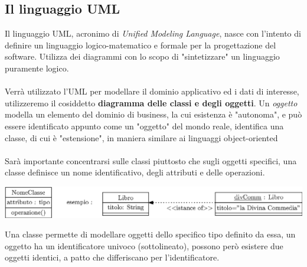\documentclass[12pt, letterpaper]{article}
\newcommand{\acc}{\\\hphantom{}\\}
\begin{document}
 \subsection{Il linguaggio UML}
Il linguaggio UML, acronimo di \textit{Unified Modeling Language}, nasce con l'intento di definire un 
linguaggio logico-matematico e formale per la progettazione del software. Utilizza dei diagrammi con lo scopo di 
"sintetizzare" un linguaggio puramente logico. \acc 
Verrà utilizzato l'UML per modellare il dominio applicativo ed i dati di interesse, utilizzeremo il cosiddetto 
\textbf{diagramma delle classi e degli oggetti}. Un \textit{oggetto} modella un elemento del dominio di business, 
la cui esistenza è "autonoma", e può essere identificato appunto come un "oggetto" del mondo reale, identifica una classe, 
di cui è "estensione", in maniera similare ai linguaggi object-oriented\acc Sarà importante concentrarsi sulle classi 
piuttosto che sugli oggetti specifici, una classe definisce un nome identificativo, degli attributi e delle 
operazioni.\begin{center}
    \includegraphics[width=\textwidth ]{images/umlBase.eps}
\end{center}
Una classe permette di modellare oggetti dello specifico tipo definito da essa, un oggetto ha un identificatore 
univoco (sottolineato), possono però esistere due oggetti identici, a patto che differiscano per 
l'identificatore.
\end{document}
